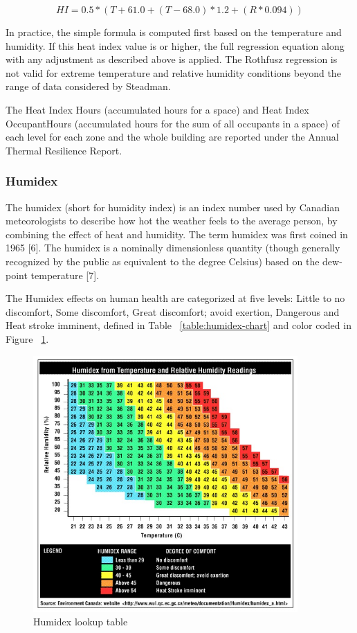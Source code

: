 \begin{equation}  \label{eq:rm-4}
HI = 0.5 * (T + 61.0 + (T - 68.0) * 1.2 + (R * 0.094))
\end{equation}

In practice, the simple formula is computed first based on the temperature and
humidity. If this heat index value is  or higher, the full regression
equation along with any adjustment as described above is applied. The Rothfusz
regression is not valid for extreme temperature and relative humidity conditions
beyond the range of data considered by Steadman.

The Heat Index Hours (accumulated hours for a space) and Heat Index
OccupantHours (accumulated hours for the sum of all occupants in a space) of
each level for each zone and the whole building are reported under the Annual
Thermal Resilience Report.

\subsubsection{Humidex}\label{humidex}

The humidex (short for humidity index) is an index number used by Canadian
meteorologists to describe how hot the weather feels to the average person, by
combining the effect of heat and humidity. The term humidex was first coined in
1965 [6]. The humidex is a nominally dimensionless quantity (though generally
recognized by the public as equivalent to the degree Celsius) based on the
dew-point temperature [7].

The Humidex effects on human health are categorized at five levels: Little to no
discomfort, Some discomfort, Great discomfort; avoid exertion, Dangerous and
Heat stroke imminent, defined in Table ~\ref{table:humidex-chart} and color
coded in Figure ~\ref{fig:humidex-lookup-table}.

\begin{figure}[hbtp] 
\centering
\includegraphics[width=0.9\textwidth, height=0.9\textheight, keepaspectratio=true]{media/humidex_chart.jpg}
\caption{Humidex lookup table \protect \label{fig:humidex-lookup-table}}
\end{figure}

